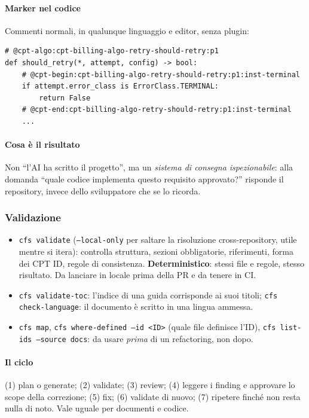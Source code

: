 \documentclass[a4paper,12pt]{article}
\begin{document}
\paragraph{Marker nel codice} Commenti normali, in qualunque linguaggio e editor, senza
plugin:
\begin{verbatim}
# @cpt-algo:cpt-billing-algo-retry-should-retry:p1
def should_retry(*, attempt, config) -> bool:
    # @cpt-begin:cpt-billing-algo-retry-should-retry:p1:inst-terminal
    if attempt.error_class is ErrorClass.TERMINAL:
        return False
    # @cpt-end:cpt-billing-algo-retry-should-retry:p1:inst-terminal
    ...
\end{verbatim}

\paragraph{Cosa è il risultato} Non ``l'AI ha scritto il progetto'', ma un
\emph{sistema di consegna ispezionabile}: alla domanda ``quale codice implementa questo
requisito approvato?'' risponde il repository, invece dello sviluppatore che se lo ricorda.

\subsubsection{Validazione}

\begin{itemize}
  \item \texttt{cfs validate} (\texttt{--local-only} per saltare la risoluzione
        cross-repository, utile mentre si itera): controlla struttura, sezioni
        obbligatorie, riferimenti, forma dei CPT ID, regole di consistenza.
        \textbf{Deterministico}: stessi file e regole, stesso risultato. Da lanciare in
        locale prima della PR e da tenere in CI.
  \item \texttt{cfs validate-toc}: l'indice di una guida corrisponde ai suoi titoli;
        \texttt{cfs check-language}: il documento è scritto in una lingua ammessa.
  \item \texttt{cfs map}, \texttt{cfs where-defined --id <ID>} (quale file definisce
        l'ID), \texttt{cfs list-ids --source docs}: da usare \emph{prima} di un
        refactoring, non dopo.
\end{itemize}

\paragraph{Il ciclo} (1) plan o generate; (2) validate; (3) review; (4) leggere i finding
e approvare lo scope della correzione; (5) fix; (6) validate di nuovo; (7) ripetere finché
non resta nulla di noto. Vale uguale per documenti e codice.
\end{document}
